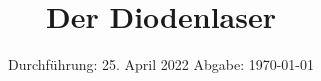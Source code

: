 

\subject{V60}
\title{Der Diodenlaser}
\date{%
  Durchführung: 25. April 2022
  \hspace{3em}
  Abgabe: \today
}



\maketitle
\thispagestyle{empty}
\tableofcontents
\newpage








\nocite{matplotlib}
\nocite{scipy}
\nocite{numpy}
\nocite{uncertainties}

\printbibliography{}


